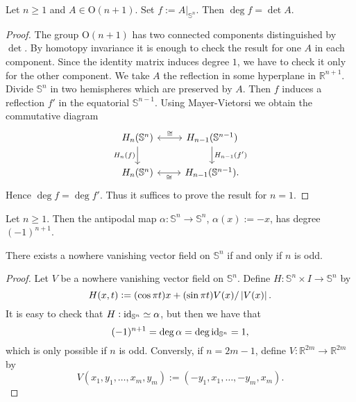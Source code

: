 \begin{proposition}
	Let $n \geq 1$ and $A \in \mathrm{O}(n + 1)$. Set $f := A \vert_{\mathbb{S}^n}$. Then $\deg f = \det A$.
\end{proposition}

\begin{proof}
	The group $\mathrm{O}(n + 1)$ has two connected components distinguished by $\det$. By homotopy invariance it is enough to check the result for one $A$ in each component. Since the identity matrix induces degree $1$, we have to check it only for the other component. We take $A$ the reflection in some hyperplane in $\mathbb{R}^{n + 1}$. Divide $\mathbb{S}^n$ in two hemispheres which are preserved by $A$. Then $f$ induces a reflection $f'$ in the equatorial $\mathbb{S}^{n - 1}$. Using Mayer-Vietorsi we obtain the commutative diagram
	\begin{equation*}
		\begin{tikzcd}
			H_n(\mathbb{S}^n) \arrow[d,"H_n(f)"']\arrow[r,leftrightarrow,"\cong"] & H_{n - 1}(\mathbb{S}^{n - 1})\arrow[d,"H_{n - 1}(f')"]\\
			H_n(\mathbb{S}^n) \arrow[r,leftrightarrow,"\cong"'] & H_{n - 1}(\mathbb{S}^{n - 1}).
		\end{tikzcd}
	\end{equation*}
	Hence $\deg f = \deg f'$. Thus it suffices to prove the result for $n = 1$.
\end{proof}

\begin{corollary}
	Let $n \geq 1$. Then the antipodal map $\alpha : \mathbb{S}^n \to \mathbb{S}^n$, $\alpha(x) := -x$, has degree $(-1)^{n + 1}$.
\end{corollary}

\begin{theorem}
	There exists a nowhere vanishing vector field on $\mathbb{S}^n$ if and only if $n$ is odd.
\end{theorem}

\begin{proof}
	Let $V$ be a nowhere vanishing vector field on $\mathbb{S}^n$. Define $H : \mathbb{S}^n \times I \to \mathbb{S}^n$ by
	\begin{equation*}
		H(x,t) := (\cos \pi t) x + (\sin \pi t) V(x)/\abs[0]{V(x)}.
	\end{equation*}
	It is easy to check that $H : \operatorname{id}_{\mathbb{S}^n} \simeq \alpha$, but then we have that 
	\begin{equation*}
		(-1)^{n + 1} = \deg \alpha = \deg \operatorname{id}_{\mathbb{S}^n} = 1,
	\end{equation*}
	\noindent which is only possible if $n$ is odd. Conversly, if $n = 2m - 1$, define $V : \mathbb{R}^{2m} \to \mathbb{R}^{2m}$ by
	\begin{equation*}
		V(x_1,y_1,\dots,x_m,y_m) := (-y_1,x_1,\dots,-y_m,x_m).
	\end{equation*}
\end{proof}

